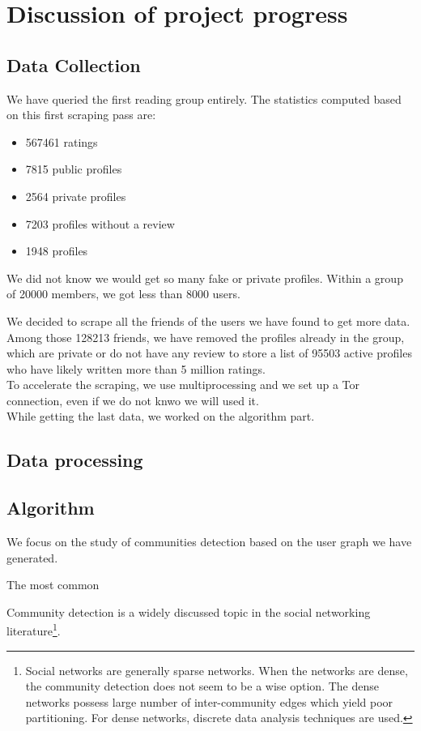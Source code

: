 \documentclass[11pt]{article}
\begin{document}
\section{Discussion of project progress}
\subsection{Data Collection}

We have queried the first reading group entirely.
The statistics computed based on this first scraping pass are:
\begin{itemize}
\item 567461 ratings
\item 7815 public profiles
\item 2564 private profiles
\item 7203 profiles without a review
\item 1948 profiles 
\end{itemize}

We did not know we would get so many fake or private profiles. Within a group of 20000 members, we got less than 8000 users.

We decided to scrape all the friends of the users we have found to get more data. 
Among those 128213 friends, we have removed the profiles already in the group, which are private or do not have any review to store a list of 95503 active profiles who have likely written more than 5 million ratings.\\

To accelerate the scraping, we use multiprocessing and we set up a Tor connection, even if we do not knwo we will used it.\\
While getting the last data, we worked on the algorithm part.

\subsection{Data processing}

\subsection{Algorithm}

We focus on the study of communities detection based on the user graph we have generated.

The most common 

Community detection is a widely discussed topic in the social networking literature\footnote{Social networks are generally sparse networks. When the networks are dense, the community detection does not seem to be a wise option. The dense networks possess large number of inter-community edges which yield poor partitioning. For dense networks, discrete data analysis techniques are used.}\cite{clauset}.
\end{document}
